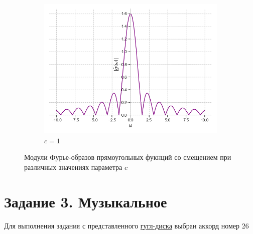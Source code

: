 \documentclass[a4paper, 16pt]{article}
\begin{document}
\begin{figure}[htbp]
\begin{subfigure}{0.3\textwidth}
            \centering
            \includegraphics[width=\linewidth]{sh_1_abs_rectf_int12.png}
            \caption{$c=1$}
            \label{fig:absshrectf_3}
        \end{subfigure}
        \caption{Модули Фурье-образов прямоугольных фукнций со смещением при различных значениях параметра $c$}
        \label{fig:absshrectfs}
    \end{figure}




    \section{Задание 3. Музыкальное}
    \noindent Для выполнения задания с представленного \href{https://drive.google.com/drive/folders/14lwzvV84uXtyuXXspoYUSf-VdR52t0sE}{гугл-диска}
    выбран аккорд номер 26
\end{document}
